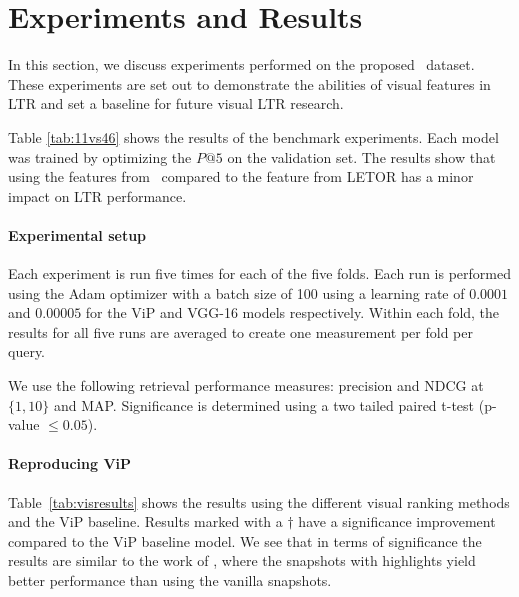 \section{Experiments and Results}
In this section, we discuss experiments performed on the proposed \datasetname~dataset.
These experiments are set out to demonstrate the abilities of visual features in LTR and set a baseline for future visual LTR research.

Table \ref{tab:11vs46} shows the results of the benchmark experiments. Each model was trained by optimizing the $P@5$ on the validation set. The results show that using the features from \datasetname~compared to the feature from LETOR has a minor impact on \ac{LTR} performance.
\fi

\paragraph{Experimental setup}

Each experiment is run five times for each of the five folds. 
Each run is performed using the Adam optimizer with a batch size of 100 using a learning rate of $0.0001$ and $0.00005$ for the ViP and VGG-16 models respectively. 
Within each fold, the results for all five runs are averaged to create one measurement per fold per query.

We use the following retrieval performance measures: precision and NDCG at $\{1,10\}$ and MAP.
Significance is determined using a two tailed paired t-test (p-value $\leq 0.05$). 

\paragraph{Reproducing ViP}
Table~\ref{tab:visresults} shows the results using the different visual ranking methods and the ViP baseline. 
Results marked with a $\dagger$ have a significance improvement compared to the ViP baseline model. 
We see that in terms of significance the results are similar to the work of \citet{fan2017learning}, where the snapshots with highlights yield better performance than using the vanilla snapshots.

